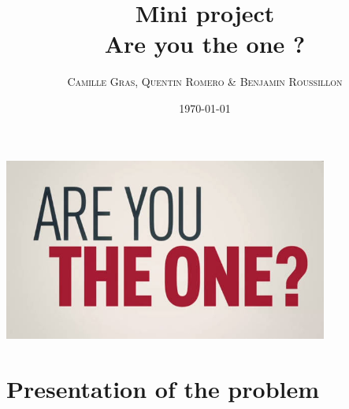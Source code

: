 \documentclass[a4,12pt]{article}
\title{\textbf{Mini project \\ Are you the one ? }}
\author{
\begin{tabular}{cc}
	\textsc{Camille Gras, } \textsc{Quentin Romero \&} \textsc{Benjamin Roussillon} 
\end{tabular}}
\date{\small \today}
\begin{document}
\maketitle

\begin{center}
	\includegraphics[width=0.8\textwidth]{AreYouTheOne.jpg} 
\end{center}
\newpage

\section*{Presentation of the problem}
\end{document}
